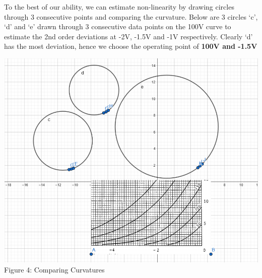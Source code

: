 \documentclass[11pt]{article}
\newcommand{\tab}{\hspace*{6mm}}
\begin{document}
\tab To the best of our ability, we can estimate non-linearity by drawing circles through 3 consecutive points and comparing the curvature. Below are 3 circles ‘c’, ‘d’ and ‘e’ drawn through 3 consecutive data points on the 100V curve to estimate the 2nd order deviations at -2V, -1.5V and -1V respectively. Clearly ‘d’ has the most deviation, hence we choose the operating point of \textbf{100V and -1.5V}
\vspace{20mm}
\begin{center}
    \includegraphics[width=\textwidth]{Documentation LaTeX/curvature.png}\\
    \small{Figure 4: Comparing Curvatures}
\end{center}
\end{document}
